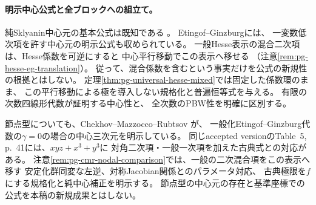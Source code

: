 \paragraph{明示中心公式と全ブロックへの組立て。}
純Sklyanin中心元の基本公式は既知である
\cite{SmithTate,DeLaetLeBruyn}。
Etingof--Ginzburg\cite[\S9, p.~1414]{EG}には、
一変数低次項を許す中心元の明示公式も収められている。
一般Hesse表示の混合二次項は、Hesse係数を可逆にすると
中心平行移動でこの表示へ移せる
（注意\ref{rem:pg-hesse-eg-translation}）。
従って、混合係数を含むという事実だけを公式の新規性の根拠とはしない。
定理\ref{thm:pg-universal-hesse-mixed}では固定した係数環のまま、
この平行移動による極を導入しない規格化と普遍恒等式を与える。
有限の次数四線形代数が証明する中心性と、
全次数のPBW性を明確に区別する。

節点型についても、Chekhov--Mazzocco--Rubtsov
\cite[Lemma~4.6, 式(4.39), p.~22]{PCMR}が、
一般化Etingof--Ginzburg代数の$\gamma=0$の場合の中心三次元を明示している。
同じaccepted versionのTable~5, p.~41には、$xyz+x^3+y^3$に
対角二次項・一般一次項を加えた古典式との対応がある。
注意\ref{rem:pg-cmr-nodal-comparison}では、一般の二次混合項をこの表示へ移す
安定化群同変な左逆、対称Jacobian関係とのパラメータ対応、
古典極限を$f$にする規格化と純中心補正を明示する。
節点型の中心元の存在と基準座標での公式を本稿の新規成果とはしない。

